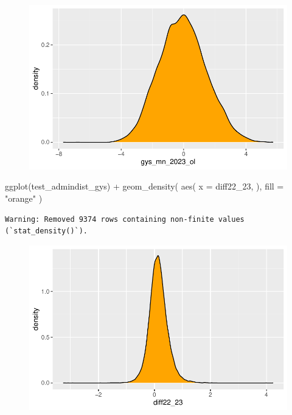 \documentclass[
  letterpaper,
  DIV=11,
  numbers=noendperiod]{scrartcl}
\newenvironment{Shaded}{\begin{snugshade}}{\end{snugshade}}
\newcommand{\AttributeTok}[1]{\textcolor[rgb]{0.40,0.45,0.13}{#1}}
\newcommand{\FunctionTok}[1]{\textcolor[rgb]{0.28,0.35,0.67}{#1}}
\newcommand{\NormalTok}[1]{\textcolor[rgb]{0.00,0.23,0.31}{#1}}
\newcommand{\SpecialCharTok}[1]{\textcolor[rgb]{0.37,0.37,0.37}{#1}}
\newcommand{\StringTok}[1]{\textcolor[rgb]{0.13,0.47,0.30}{#1}}
\begin{document}
\begin{figure}[H]

{\centering \includegraphics{GeospatialMapping_files/figure-pdf/district-scores-density-2.pdf}

}

\end{figure}

\begin{Shaded}
\begin{Highlighting}[]
\FunctionTok{ggplot}\NormalTok{(test\_admindist\_gys) }\SpecialCharTok{+}
  \FunctionTok{geom\_density}\NormalTok{(}
    \FunctionTok{aes}\NormalTok{(}
      \AttributeTok{x =}\NormalTok{ diff22\_23,}
\NormalTok{      ),}
    \AttributeTok{fill =} \StringTok{"orange"}
\NormalTok{  )}
\end{Highlighting}
\end{Shaded}

\begin{verbatim}
Warning: Removed 9374 rows containing non-finite values (`stat_density()`).
\end{verbatim}

\begin{figure}[H]

{\centering \includegraphics{GeospatialMapping_files/figure-pdf/district-scores-density-3.pdf}

}

\end{figure}
\end{document}
